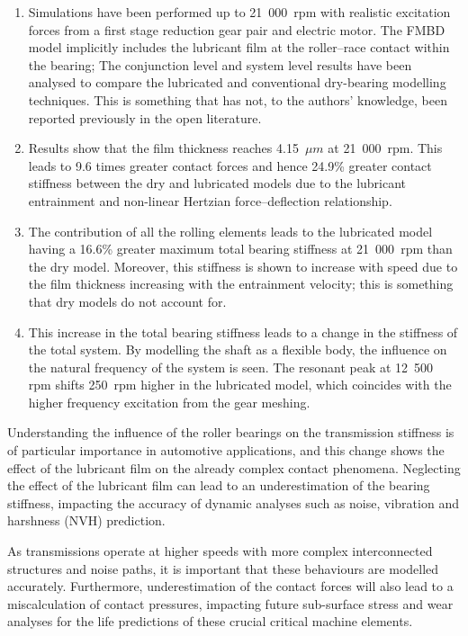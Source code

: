 \begin{enumerate} 
	\item Simulations have been performed up to 21~000~$\mathrm{rpm}$ with realistic excitation forces from a first stage reduction gear pair and electric motor. The FMBD model implicitly includes the lubricant film at the roller–race contact within the bearing; The conjunction level and system level results have been analysed to compare the lubricated and conventional dry-bearing modelling techniques. This is something that has not, to the authors’ knowledge, been reported previously in the open literature.
	\item Results show that the film thickness reaches 4.15~${\mu m}$ at 21~000~$\mathrm{rpm}$. This leads to 9.6 times greater contact forces and hence 24.9\% greater contact stiffness between the dry and lubricated models due to the lubricant entrainment and non-linear Hertzian force–deflection relationship. 
	\item The contribution of all the rolling elements leads to the lubricated model having a 16.6\% greater maximum total bearing stiffness at 21~000~$\mathrm{rpm}$ than the dry model. Moreover, this stiffness is shown to increase with speed due to the film thickness increasing with the entrainment velocity; this is something that dry models do not account for.
	\item This increase in the total bearing stiffness leads to a change in the stiffness of the total system. By modelling the shaft as a flexible body, the influence on the natural frequency of the system is seen. The resonant peak at 12~500~$\mathrm{rpm}$ shifts 250~$\mathrm{rpm}$ higher in the lubricated model, which coincides with the higher frequency excitation from the gear meshing.
\end{enumerate}

Understanding the influence of the roller bearings on the transmission stiffness is of particular importance in automotive applications, and this change shows the effect of the lubricant film on the already complex contact phenomena. Neglecting the effect of the lubricant film can lead to an underestimation of the bearing stiffness, impacting the accuracy of dynamic analyses such as noise, vibration and harshness (NVH) prediction. 

As transmissions operate at higher speeds with more complex interconnected structures and noise paths, it is important that these behaviours are modelled accurately. Furthermore, underestimation of the contact forces will also lead to a miscalculation of contact pressures, impacting future sub-surface stress and wear analyses for the life predictions of these crucial critical  machine elements.



